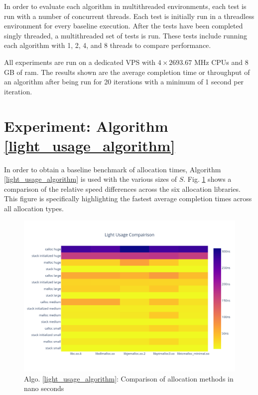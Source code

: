 \documentclass[letterpaper, 10 pt, conference]{ieeeconf}  %
\begin{document}
In order to evaluate each algorithm in multithreaded environments, each test is run with a number of concurrent threads.
Each test is initially run in a threadless environment for every baseline execution.
After the tests have been completed singly threaded, a multithreaded set of tests is run.
These tests include running each algorithm with 1, 2, 4, and 8 threads to compare performance.

All experiments are run on a dedicated VPS with $4 \times 2693.67$ MHz CPUs and $8$GB of ram.
The results shown are the average completion time or throughput of an algorithm after being run for 20 iterations with a minimum of 1 second per iteration.

\section{Experiment: Algorithm \ref{light_usage_algorithm}}
In order to obtain a baseline benchmark of allocation times, Algorithm \ref{light_usage_algorithm} is used with the various sizes of $S$.
Fig. \ref{algo1_complete_hist} shows a comparison of the relative speed differences across the six allocation libraries.
This figure is specifically highlighting the fastest average completion times across all allocation types.

\begin{figure}[tbh!]
  \centering
  \includegraphics[width=\columnwidth]{graphs/light_hist.png}
  \caption{ Algo. \ref{light_usage_algorithm}: Comparison of allocation methods in nano seconds }
  \label{algo1_complete_hist}
\end{figure} 
\end{document}
